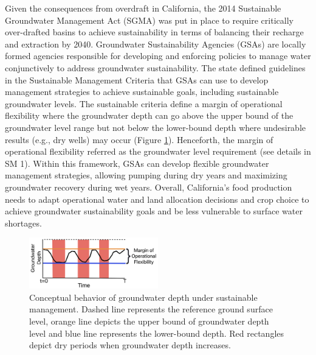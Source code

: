 \documentclass[a4paper,fleqn]{cas-sc}
\begin{document}
Given the consequences from overdraft in California, the 2014 Sustainable Groundwater Management Act (SGMA) \citep{dwr_sustainable_2021} was put in place to require critically over-drafted basins to achieve sustainability in terms of balancing their recharge and extraction by 2040. Groundwater Sustainability Agencies (GSAs) are locally formed agencies responsible for developing and enforcing policies to manage water conjunctively to address groundwater sustainability. The state defined guidelines in the Sustainable Management Criteria \citep{dwr_sustainable_2017} that GSAs can use to develop management strategies to achieve sustainable goals, including sustainable groundwater levels. The sustainable criteria define a margin of operational flexibility where the groundwater depth can go above the upper bound of the groundwater level range but not below the lower-bound depth where undesirable results (e.g., dry wells) may occur (Figure \ref{fig:1}). Henceforth, the margin of operational flexibility referred as the groundwater level requirement (see details in SM 1). Within this framework, GSAs can develop flexible groundwater management strategies, allowing pumping during dry years and maximizing groundwater recovery during wet years. Overall, California's food production needs to adapt operational water and land allocation decisions and crop choice to achieve groundwater sustainability goals and be less vulnerable to surface water shortages. 


 \begin{figure}[ht]
    \includegraphics[width=0.5\textwidth,center]{./figs/conceptual_sgma_policy.jpg}
    \caption{Conceptual behavior of groundwater depth under sustainable management. Dashed line represents the reference ground surface level, orange line depicts the upper bound of groundwater depth level and blue line represents the lower-bound depth. Red rectangles depict dry periods when groundwater depth increases.}
    \label{fig:1}
\end{figure}
\end{document}
